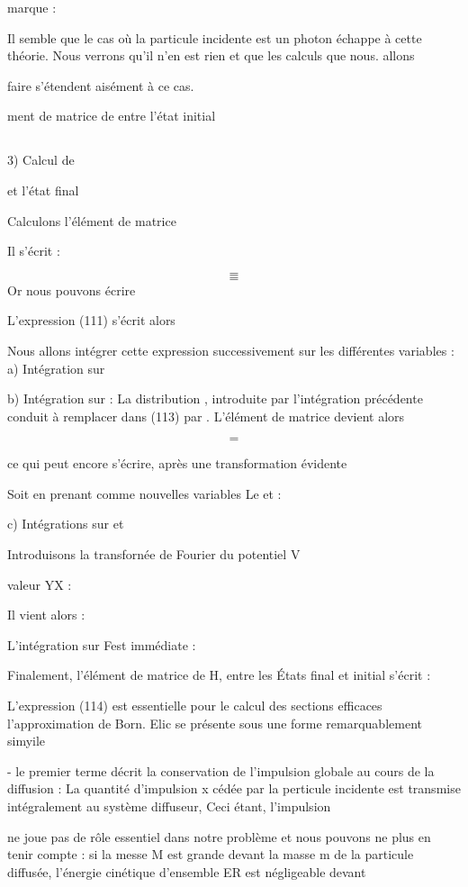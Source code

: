 marque :

Il semble que le cas où la particule incidente est un photon échappe à cette
théorie. Nous verrons qu’il n'en est rien et que les calculs que nous. allons

faire s'étendent aisément à ce cas.

ment de matrice  de  entre l'état initial

\subsection{}%
3) Calcul de

et l'état final

Calculons l'élément de matrice 

Il s'écrit :
 
\[
\tag{112}=
\]
\[
\tag{113}=
\]
Or nous pouvons écrire

L'expression (111) s'écrit alors

Nous allons intégrer cette expression successivement sur les différentes variables :
a) Intégration sur

b) Intégration sur  :
La distribution , introduite par l'intégration précédente conduit à
remplacer dans (113)  par .
L'élément de matrice devient alors
 
\[
\tag{114}=
\]


ce qui peut encore s'écrire, après une transformation évidente

Soit en prenant comme nouvelles variables Le  et  :

c) Intégrations sur  et 

Introduisons la transfornée de Fourier du potentiel V

valeur YX :

Il vient alors :

L'intégration sur Fest immédiate :

Finalement, l'élément de matrice de H, entre les États final et initial s'écrit :

L'expression (114) est essentielle pour le calcul des sections efficaces  l'approximation
de Born. Elic se présente sous une forme remarquablement simyile

- le premier terme  décrit la conservation de l'impulsion globale au
cours de la diffusion : La quantité d'impulsion x cédée par la perticule incidente
est transmise intégralement au système diffuseur, Ceci étant, l'impulsion 


 ne joue pas de rôle essentiel dans notre problème et nous pouvons ne
plus en tenir compte : si la messe M est grande devant la masse m de la particule
diffusée, l'énergie cinétique d'ensemble ER est négligeable devant

